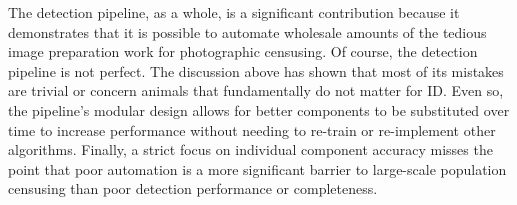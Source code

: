The detection pipeline, as a whole, is a significant contribution because it demonstrates that it is possible to automate wholesale amounts of the tedious image preparation work for photographic censusing. Of course, the detection pipeline is not perfect.  The discussion above has shown that most of its mistakes are trivial or concern animals that fundamentally do not matter for ID. Even so, the pipeline's modular design allows for better components to be substituted over time to increase performance without needing to re-train or re-implement other algorithms.  Finally, a strict focus on individual component accuracy misses the point that poor automation is a more significant barrier to large-scale population censusing than poor detection performance or completeness.
